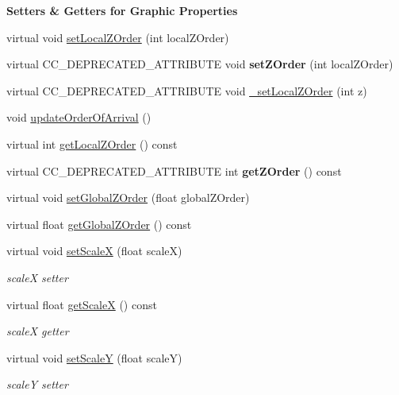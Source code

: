 \begin{Indent}\textbf{ Setters \& Getters for Graphic Properties}\par
\begin{DoxyCompactItemize}
\item 
virtual void \hyperlink{classNode_aee4e616c2d55b722226aae1e68b4946f}{set\+Local\+Z\+Order} (int local\+Z\+Order)
\item 
\mbox{\label{classNode_ae88b083cf8714fe62a3180ca790073a4}} 
virtual C\+C\+\_\+\+D\+E\+P\+R\+E\+C\+A\+T\+E\+D\+\_\+\+A\+T\+T\+R\+I\+B\+U\+TE void {\bfseries set\+Z\+Order} (int local\+Z\+Order)
\item 
virtual C\+C\+\_\+\+D\+E\+P\+R\+E\+C\+A\+T\+E\+D\+\_\+\+A\+T\+T\+R\+I\+B\+U\+TE void \hyperlink{classNode_a9228657d144a272e8ac471c5a9b9e0dc}{\+\_\+set\+Local\+Z\+Order} (int z)
\item 
void \hyperlink{classNode_a75318d1418261ae7e8856ba2868b5a81}{update\+Order\+Of\+Arrival} ()
\item 
virtual int \hyperlink{classNode_a9a9c743ae124b0c1a2d6f0a28a1f06dd}{get\+Local\+Z\+Order} () const
\item 
\mbox{\label{classNode_a8637477bb812d66559eb8ca6b6f5c854}} 
virtual C\+C\+\_\+\+D\+E\+P\+R\+E\+C\+A\+T\+E\+D\+\_\+\+A\+T\+T\+R\+I\+B\+U\+TE int {\bfseries get\+Z\+Order} () const
\item 
virtual void \hyperlink{classNode_a32a5b9cb9a408d04008c4935a4776566}{set\+Global\+Z\+Order} (float global\+Z\+Order)
\item 
virtual float \hyperlink{classNode_afa5a7920169dbe5f21a59029bb04c166}{get\+Global\+Z\+Order} () const
\item 
virtual void \hyperlink{classNode_acf7f04074f7f49972e152788c090b877}{set\+ScaleX} (float scaleX)
\begin{DoxyCompactList}\small\item\em scaleX setter \end{DoxyCompactList}\item 
virtual float \hyperlink{classNode_a27040ef8ab59ccf42b87d6ddc8d794e6}{get\+ScaleX} () const
\begin{DoxyCompactList}\small\item\em scaleX getter \end{DoxyCompactList}\item 
virtual void \hyperlink{classNode_aec805a1fa9e8e1038556e468138bb804}{set\+ScaleY} (float scaleY)
\begin{DoxyCompactList}\small\item\em scaleY setter \end{DoxyCompactList}\item 

\end{DoxyCompactItemize}
\end{Indent}
